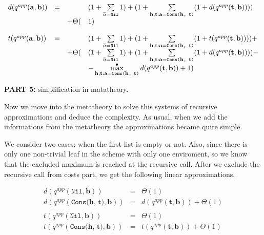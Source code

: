 \[
\begin{array}{lcll}
d(q^{app}(\mathbf{a}, \mathbf{b})) & = & & (1 + \sum\limits_{\overline{a} = \texttt{Nil}} 1) + (1 + \sum\limits_{\mathbf{h}, \mathbf{t}: \mathbf{a} = \texttt{Cons($\mathbf{h}$, $\mathbf{t}$)}} (1 + d(q^{app}(\mathbf{t}, \mathbf{b})))) \\
& & + \Theta( & 1) \\
\\
t(q^{app}(\mathbf{a}, \mathbf{b})) & = & & (1 + \sum\limits_{\overline{a} = \texttt{Nil}} 1) + (1 + \sum\limits_{\mathbf{h}, \mathbf{t}: \mathbf{a} = \texttt{Cons($\mathbf{h}$, $\mathbf{t}$)}} (1 + t(q^{app}(\mathbf{t}, \mathbf{b})))) + \\
& & + \Theta( & (1 + \sum\limits_{\overline{a} = \texttt{Nil}} 1) + (1 + \sum\limits_{\mathbf{h}, \mathbf{t}: \mathbf{a} = \texttt{Cons($\mathbf{h}$, $\mathbf{t}$)}} (1 + d(q^{app}(\mathbf{t}, \mathbf{b})))) - \\
& & &  - \max^{\bullet}\limits_{\mathbf{h}, \mathbf{t}: \mathbf{a} = \texttt{Cons($\mathbf{h}$, $\mathbf{t}$)}} d(q^{app}(\mathbf{t}, \mathbf{b})) + 1) 
\end{array}
\]


\colorbox{blue!20}{\parbox{\textwidth}{\textbf{PART 5:} simplification in matatheory.}}

Now we move into the metatheory to solve this systems of recursive approximations and deduce the complexity. As usual, when we add the informations from the metatheory the approximations became quite simple.

We consider two cases: when the first list is empty or not. Also, since there is only one non-trivial leaf in the scheme with only one enviroment, so we know that the excluded maximum is reached at the recursive call. After we exclude the recursive call from costs part, we get the following linear approximations. 

\[
\begin{array}{lcl}
d(q^{app}(\texttt{Nil}, \mathbf{b})) & = & \Theta(1) \\
d(q^{app}(\texttt{Cons($\mathbf{h}$, $\mathbf{t}$)}, \mathbf{b})) & = & d(q^{app}(\mathbf{t}, \mathbf{b})) + \Theta(1) \\
\\
t(q^{app}(\texttt{Nil}, \mathbf{b})) & = & \Theta(1) \\
t(q^{app}(\texttt{Cons($\mathbf{h}$, $\mathbf{t}$)}, \mathbf{b})) & = & t(q^{app}(\mathbf{t}, \mathbf{b})) + \Theta(1) \\
\end{array}
 \]
 
